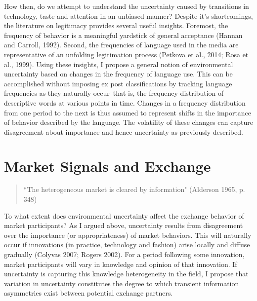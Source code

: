 How then, do we attempt to understand the uncertainty caused by transitions in technology, taste and attention in an unbiased manner? Despite it's shortcomings, the literature on legitimacy provides several useful insights. Foremost, the frequency of  behavior is a meaningful yardstick of general acceptance (Hannan and Carroll, 1992). Second, the frequencies of language used in the media are representative of an unfolding legitimation process (Petkova et al., 2014; Rosa et al., 1999). Using these insights, I propose a general notion of environmental uncertainty based on changes in the frequency of language use. This can be accomplished without imposing ex post classifications by tracking language frequencies as they naturally occur--that is, the frequency distribution of descriptive words at various points in time. Changes in a frequency distribution from one period to the next is thus assumed to represent shifts in the importance of behavior described by the language. The volatility of these changes can capture disagreement about importance and hence uncertainty as previously described. 

\section{Market Signals and Exchange}

\begin{small}
\begin{quote}
``The heterogeneous market is cleared by information" (Alderson 1965, p. 348)
\end{quote}
\end{small}

To what extent does environmental uncertainty affect the exchange behavior of market participants?  As I argued above, uncertainty results from disagreement over the importance (or appropriateness) of market behaviors. This will naturally occur if innovations (in practice, technology and fashion) arise locally and diffuse gradually (Colyvas 2007; Rogers 2002). For a period following some innovation, market participants will vary in knowledge and opinion of that innovation. If uncertainty is capturing this knowledge heterogeneity in the field, I propose that variation in uncertainty constitutes the degree to which transient information asymmetries exist between potential exchange partners. 

